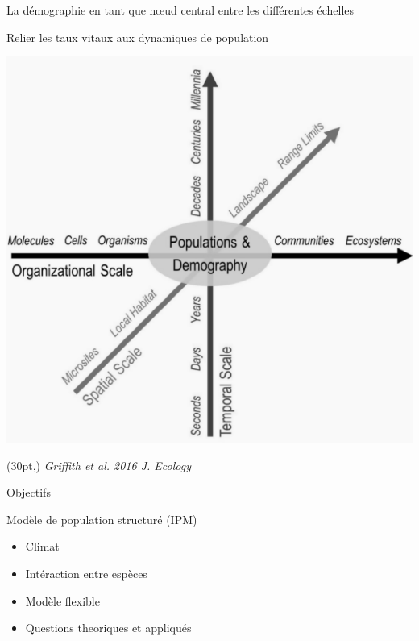 \documentclass[11pt, compress, aspectratio=1610]{beamer}
\newcommand\smallcitation[1]{%
\begin{textblock*}{\textwidth}(30pt,\textheight)
	\raggedleft \footnotesize\textit{#1}
\end{textblock*}}
\providecommand{\tightlist}{%
  \setlength{\itemsep}{0pt}\setlength{\parskip}{0pt}}
\begin{document}
\begin{frame}{La démographie en tant que nœud central entre les
différentes échelles}
\protect\hypertarget{la-duxe9mographie-en-tant-que-nux153ud-central-entre-les-diffuxe9rentes-uxe9chelles}{}

\vspace*{-5mm}

Relier les taux vitaux aux dynamiques de population

\centering

\includegraphics[scale=0.65]{figures/Griffith2016.png}

\par

\smallcitation{Griffith et al. 2016 J. Ecology}

\end{frame}

\begin{frame}{Objectifs}
\protect\hypertarget{objectifs-1}{}

\centering

Modèle de population structuré (IPM)

\begin{itemize}
\tightlist
\item
  Climat
\item
  Intéraction entre espèces
\item
  Modèle flexible
\item
  Questions theoriques et appliqués
\end{itemize}

\end{frame}
\end{document}
